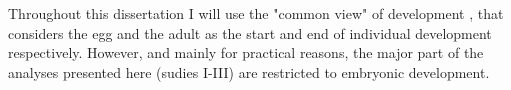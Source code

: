 Throughout this dissertation I will use the "common view" of development \citep{Minelli2014}, that considers the egg and the adult as the start and end of individual development respectively.
However, and mainly for practical reasons, the major part of the analyses presented here (sudies I-III) are restricted to embryonic development.
